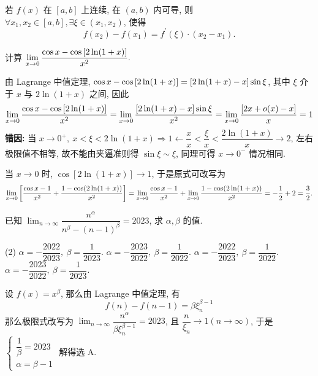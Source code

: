 \begin{theorem}
    若 $ f(x) $ 在 $ [a, b] $ 上连续, 在 $ (a, b) $ 内可导, 则 $ \forall x_{1}, x_{2} \in[a, b], \exists \xi \in\left(x_{1}, x_{2}\right) $, 使得
    $$f\left(x_{2}\right)-f\left(x_{1}\right)=f^{\prime}(\xi)\cdot(x_{2}-x_{1}) .$$
\end{theorem}

\begin{example}
    计算 $\displaystyle\lim_{x\to0}\dfrac{\cos x-\cos\qty[2\ln(1+x)]}{x^2}.$
\end{example}
\begin{errorSolution}
    由 Lagrange 中值定理, $\cos x-\cos\qty[2\ln(1+x)]=\qty[2\ln(1+x)-x]\sin\xi$, 其中 $\xi$ 介于 $x$ 与 $2\ln(1+x)$ 之间, 因此
    $$\lim_{x\to0}\dfrac{\cos x-\cos\qty[2\ln(1+x)]}{x^2}=\lim_{x\to0}\dfrac{\qty[2\ln(1+x)-x]\sin\xi}{x^2}=\lim_{x\to0}\dfrac{\qty[2x+o(x)-x]}{x}=1$$
    \textbf{错因: }当 $x\to0^+,~x<\xi<2\ln(1+x)\Rightarrow 1\gets\dfrac{x}{x}<\dfrac{\xi}{x}<\dfrac{2\ln(1+x)}{x}\to 2$, 左右极限值不相等, 故不能由夹逼准则得 $\sin\xi\sim\xi$, 同理可得 $x\to0^-$ 情况相同.\\
\end{errorSolution}
\begin{solution}
    当 $x\to0$ 时, $\cos [2\ln(1+x)]\to1$, 于是原式可改写为 $$\lim_{x\to0}\qty[\dfrac{\cos x-1}{x^2}+\dfrac{1-\cos(2\ln(1+x))}{x^2}]=\lim_{x\to0}\dfrac{\cos x-1}{x^2}+\lim_{x\to0}\dfrac{1-\cos(2\ln(1+x))}{x^2}=-\dfrac{1}{2}+2=\dfrac{3}{2}.$$
\end{solution}

\begin{example}
    已知 $\displaystyle\lim_{n\to\infty}\dfrac{n^{\alpha}}{n^\beta-(n-1)^\beta}=2023$, 求 $\alpha,\beta$ 的值.
    \begin{tasks}(2)
        \task $\alpha=-\dfrac{2022}{2023},~\beta=\dfrac{1}{2023}.$
        \task $\alpha=-\dfrac{2023}{2022},~\beta=\dfrac{1}{2022}.$
        \task $\alpha=-\dfrac{2022}{2023},~\beta=\dfrac{1}{2022}.$
        \task $\alpha=-\dfrac{2023}{2022},~\beta=\dfrac{1}{2023}.$
    \end{tasks}
\end{example}
\begin{solution}
    设 $f(x)=x^\beta$, 那么由 Lagrange 中值定理, 有 $$f(n)-f(n-1)=\beta\xi_n^{\beta-1}$$
    那么极限式改写为 $\displaystyle\lim_{n\to\infty}\dfrac{n^\alpha}{\beta \xi_n^{\beta-1}}=2023$,
    且 $\dfrac{n}{\xi_n}\to1(n\to\infty)$, 于是 $\begin{cases}
            \dfrac{1}{\beta}=2023 \\\alpha=\beta-1
        \end{cases}$ 解得选 A.
\end{solution}

